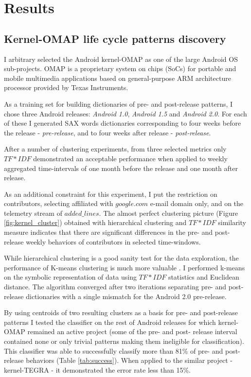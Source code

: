 \documentclass[10pt, conference, compsocconf]{IEEEtran}
\begin{document}
\section{Results}
\subsection{Kernel-OMAP life cycle patterns discovery}
I arbitrary selected the Android kernel-OMAP as one of the large Android OS sub-projects. 
OMAP is a proprietary system on chips (SoCs) for portable and mobile multimedia applications 
based on general-purpose ARM architecture processor provided by Texas Instruments.

As a training set for building dictionaries of pre- and post-release patterns, I chose three Android releases:
\textit{Android 1.0}, \textit{Android 1.5} and \textit{Android 2.0}. For each of these I generated
SAX words dictionaries corresponding to four weeks before the release - \textit{pre-release}, and to four 
weeks after release - \textit{post-release}.

After a number of clustering experiments, from three selected metrics only $TF\ast IDF$ demonstrated an 
acceptable performance when applied to weekly aggregated time-intervals of one month before the release 
and one month after release.

As an additional constraint for this experiment, I put the restriction on contributors, 
selecting affiliated with $google.com$ e-mail domain only, and on the telemetry stream of $added\_lines$.
The almost perfect clustering picture (Figure \ref{fig:kernel_cluster}) obtained with hierarchical 
clustering and $TF\ast IDF$ similarity measure indicates that there are significant differences 
in the pre- and post-release weekly behaviors of contributors in selected time-windows.

While hierarchical clustering is a good sanity test for the data exploration, the performance of K-means 
clustering is much more valuable \cite{citeulike:3562}. I performed k-means on the symbolic 
representation of data using $TF\ast IDF$ statistics and Euclidean distance. The algorithm converged after two
iterations separating pre- and post-release dictionaries with a single mismatch for the Android 2.0 pre-release.

By using centroids of two resulting clusters as a basis for pre- and post-release patterns I tested 
the classifier on the rest of Android releases for which kernel-OMAP remained an active project
(some of the pre- and post- release interval contained none or only trivial patterns making them
ineligible for classification). This classifier was able to successfully classify more than 81\% 
of pre- and post-release behaviors (Table \ref{tab:success}). When applied to the similar project -
kernel-TEGRA - it demonstrated the error rate less than 15\%.
\end{document}

